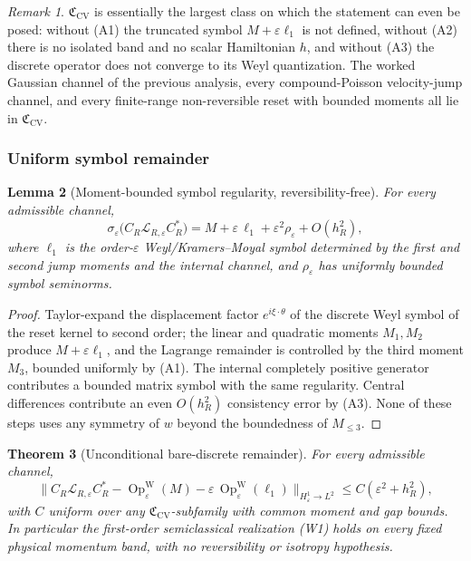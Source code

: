 \documentclass[11pt]{article}
\newtheorem{theorem}{Theorem}[section]
\newtheorem{lemma}[theorem]{Lemma}
\theoremstyle{definition}
\theoremstyle{remark}
\newtheorem{remark}[theorem]{Remark}
\newcommand{\eps}{\varepsilon}
\newcommand{\Lcal}{\mathcal L}
\newcommand{\CV}{\mathfrak C_{\mathrm{CV}}}
\newcommand{\OpW}{\operatorname{Op}^{\mathrm W}_\eps}
\begin{document}
\begin{remark}
\label{rem:cv-natural}
$\CV$ is essentially the largest class on which the statement can even be posed:
without (A1) the truncated symbol $M+\eps\ell_1$ is not defined, without (A2) there
is no isolated band and no scalar Hamiltonian $h$, and without (A3) the discrete
operator does not converge to its Weyl quantization.  The worked Gaussian channel
of the previous analysis, every compound-Poisson velocity-jump channel, and every
finite-range non-reversible reset with bounded moments all lie in $\CV$.
\end{remark}

\subsubsection{Uniform symbol remainder}
\label{sec:partI}

\begin{lemma}[Moment-bounded symbol regularity, reversibility-free]
\label{lem:cv-symbol-reg}
For every admissible channel,
\[
 \sigma_\eps\bigl(C_R\Lcal_{R,\eps}C_R^*\bigr)
 =M+\eps\,\ell_1+\eps^2\rho_\eps+O(h_R^2),
\]
where $\ell_1$ is the order-$\eps$ Weyl/Kramers--Moyal symbol determined by the
first and second jump moments and the internal channel, and $\rho_\eps$ has
uniformly bounded symbol seminorms.
\end{lemma}

\begin{proof}
Taylor-expand the displacement factor $e^{i\xi\cdot\theta}$ of the discrete Weyl
symbol of the reset kernel to second order; the linear and quadratic moments
$M_1,M_2$ produce $M+\eps\ell_1$, and the Lagrange remainder is controlled by the
third moment $M_3$, bounded uniformly by (A1).  The internal completely positive
generator contributes a bounded matrix symbol with the same regularity.  Central
differences contribute an even $O(h_R^2)$ consistency error by (A3).  None of
these steps uses any symmetry of $w$ beyond the boundedness of $M_{\le 3}$.
\end{proof}

\begin{theorem}[Unconditional bare-discrete remainder]
\label{thm:unconditional-bare-remainder}
For every admissible channel,
\[
 \bigl\|C_R\Lcal_{R,\eps}C_R^*
 -\OpW(M)-\eps\,\OpW(\ell_1)\bigr\|_{H^1_\eps\to L^2}\le C(\eps^2+h_R^2),
\]
with $C$ uniform over any $\CV$-subfamily with common moment and gap bounds.  In
particular the first-order semiclassical realization \textup{(W1)} holds on every
fixed physical momentum band, with no reversibility or isotropy hypothesis.
\end{theorem}
\end{document}

